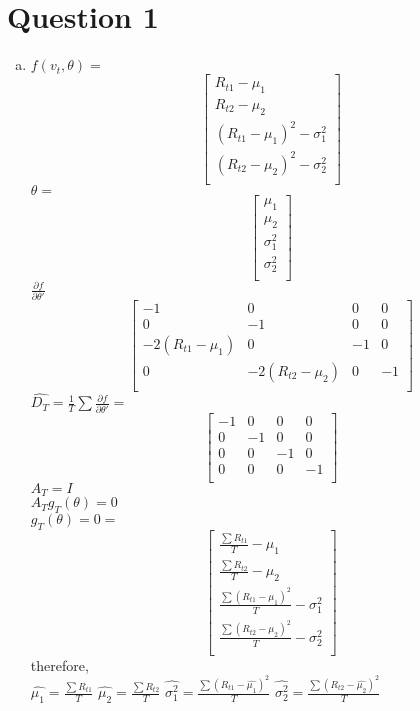 
\section*{Question 1}

\begin{enumerate}[(a)]
    \item $f(v_t,\theta) = $
    \[
\begin{bmatrix}
    R_{t1}-\mu_1 \\
    R_{t2}-\mu_2\\
    (R_{t1}-\mu_1)^2-\sigma_1^2 \\
    (R_{t2}-\mu_2)^2-\sigma_2^2 \\
\end{bmatrix}
\]
$\theta = $
 \[
\begin{bmatrix}
    \mu_1 \\
    \mu_2\\
    \sigma_1^2 \\
    \sigma_2^2 \\
\end{bmatrix}
\]
$\frac{\partial f}{\partial \theta'}$
 \[
\begin{bmatrix}
    -1&0&0&0 \\
    0&-1&0&0\\
    -2(R_{t1}-\mu_1)&0&-1&0 \\
    0&-2(R_{t2}-\mu_2)&0&-1 \\
\end{bmatrix}
\]
$\hat{D_T}=\frac{1}{T}\sum \frac{\partial f}{\partial \theta '}=$
 \[
\begin{bmatrix}
    -1&0&0&0 \\
    0&-1&0&0\\
    0&0&-1&0 \\
    0&0&0&-1 \\
\end{bmatrix}
\]
$A_T=I$\\
$A_T g_T(\theta)=0$\\
$g_T(\theta) =0 =$
 \[
\begin{bmatrix}
    \frac{\sum R_{t1}}{T} - \mu_1 \\
    \frac{\sum R_{t2}}{T} - \mu_2\\
     \frac{\sum (R_{t1} - \mu_1)^2 }{T}- \sigma_1^2 \\
    \frac{\sum (R_{t2}- \mu_2)^2}{T}  - \sigma_2^2\\
\end{bmatrix}
\]
therefore, \\
$\hat{\mu_1} = \frac{\sum R_{t1}}{T}$
$\hat{\mu_2} = \frac{\sum R_{t2}}{T}$
$\hat{\sigma_1^2}=\frac{\sum (R_{t1}-\hat{\mu_1})^2}{T}$
$\hat{\sigma_2^2}=\frac{\sum (R_{t2}-\hat{\mu_2})^2}{T}$


\end{enumerate}
